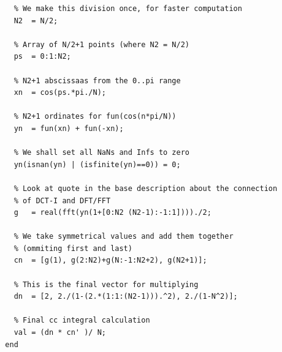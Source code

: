 \documentclass[12pt,twoside,a4paper]{article}
\numberwithin{equation}{subsection}
\numberwithin{figure}{subsection}
\begin{document}
\begin{lstlisting}
    % We make this division once, for faster computation
    N2  = N/2;                                           
    
    % Array of N/2+1 points (where N2 = N/2)
    ps  = 0:1:N2;                                        

    % N2+1 abscissaas from the 0..pi range
    xn  = cos(ps.*pi./N);                                

    % N2+1 ordinates for fun(cos(n*pi/N))
    yn  = fun(xn) + fun(-xn);                            

    % We shall set all NaNs and Infs to zero
    yn(isnan(yn) | (isfinite(yn)==0)) = 0;               

    % Look at quote in the base description about the connection 
    % of DCT-I and DFT/FFT
    g   = real(fft(yn(1+[0:N2 (N2-1):-1:1])))./2;        

    % We take symmetrical values and add them together 
    % (ommiting first and last)
    cn  = [g(1), g(2:N2)+g(N:-1:N2+2), g(N2+1)];         

    % This is the final vector for multiplying
    dn  = [2, 2./(1-(2.*(1:1:(N2-1))).^2), 2./(1-N^2)];  

    % Final cc integral calculation
    val = (dn * cn' )/ N;                                
  end	    
\end{lstlisting}
\end{document}
